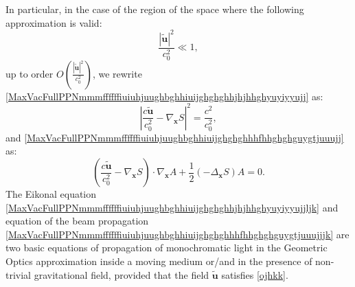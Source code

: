 \documentclass{article}
\theoremstyle{definition}
\theoremstyle{remark}
\renewcommand{\vec}[1]{\mathbf{#1}}
\newcommand{\er}{\eqref}
\newcommand{\er}{\eqref}
\begin{document}
In particular, in the case of the region of the space where the
following approximation is valid:
\begin{equation}\label{ojhkk}
\frac{|\vec {\tilde u}|^2}{c^2_0}\ll 1,
\end{equation}
up to order $O\left(\frac{|\vec {\tilde u}|^2}{c^2_0}\right)$, we
rewrite
\er{MaxVacFullPPNmmmffffffiuiuhjuughbghhiuijghghghhjhjhhghyuyiyyujj}
as:
\begin{equation}\label{MaxVacFullPPNmmmffffffiuiuhjuughbghhiuijghghghhjhjhhghyuyiyyujjljk}
\left|\frac{c\vec {\tilde u}}{c^2_0}-\nabla_\vec x
S\right|^2=\frac{c^2}{c^2_0},
\end{equation}
and
\er{MaxVacFullPPNmmmffffffiuiuhjuughbghhiuijghghghhhfhhghghguygtjuuujj}
as:
\begin{equation}\label{MaxVacFullPPNmmmffffffiuiuhjuughbghhiuijghghghhhfhhghghguygtjuuujjjk}
\left(\frac{c\vec {\tilde u}}{c^2_0}-\nabla_{\vec
x}S\right)\cdot\nabla_{\vec x}A+\frac{1}{2}\left(-\Delta_{\vec
x}S\right)A=0.
\end{equation}
The Eikonal equation
\er{MaxVacFullPPNmmmffffffiuiuhjuughbghhiuijghghghhjhjhhghyuyiyyujjljk}
and equation of the beam propagation
\er{MaxVacFullPPNmmmffffffiuiuhjuughbghhiuijghghghhhfhhghghguygtjuuujjjk}
are two basic equations of propagation of monochromatic light in the
Geometric Optics approximation inside a moving medium or/and in the
presence of non-trivial gravitational field, provided that the field
$\vec {\tilde u}$ satisfies \er{ojhkk}.
\end{document}
